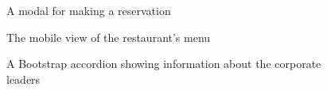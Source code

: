 \documentclass[12pt]{article}
\newcommand\nocaption[1]{\newline\footnotesize\sffamily #1}
\begin{document}

\begin{figure}[ht]
  \centering
  \nocaption{A modal for making a reservation}
  \label{fig:ristorante-3}
\end{figure}

\begin{figure}
  \centering
  \nocaption{The mobile view of the restaurant's menu}
  \label{fig:ristorante-2}
\end{figure}

\begin{figure}
  \centering
  \nocaption{A Bootstrap accordion showing information about the corporate leaders}
  \label{fig:ristorante-4}
\end{figure}
\end{document}
